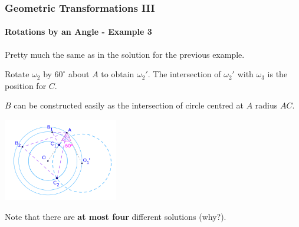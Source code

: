 \documentclass[8pt,xcolor=table,dvipsnames]{beamer}
\newcommand{\dg}{^\circ}
\begin{document}
\begin{frame}[t]
    \frametitle{Geometric Transformations III}
    \framesubtitle{Rotations by an Angle - Example 3}
    Pretty much the same as in the solution for the previous example.
    
    \bigbreak
    Rotate $\omega_2$ by $60\dg$ about $A$ to obtain $\omega_2'$.
    The intersection of $\omega_2'$ with $\omega_3$ is the position for $C.$

    $B$ can be constructed easily as the intersection of circle centred at $A$ radius $AC.$
    \begin{center}
        \includegraphics[width=5cm]{./svg/pdf/rotation-5b.pdf}
    \end{center}

    \bigbreak
    Note that there are \textbf{at most four} different solutions (why?).
\end{frame}
\end{document}
